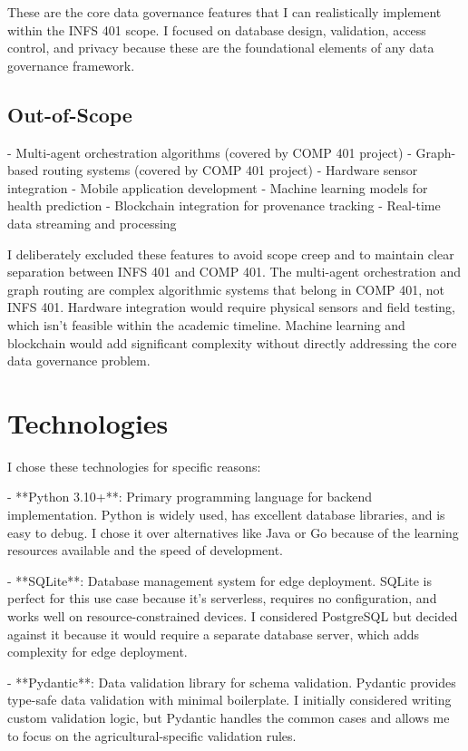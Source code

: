 These are the core data governance features that I can realistically implement within the INFS 401 scope. I focused on database design, validation, access control, and privacy because these are the foundational elements of any data governance framework.

\subsection{Out-of-Scope}
- Multi-agent orchestration algorithms (covered by COMP 401 project)
- Graph-based routing systems (covered by COMP 401 project)
- Hardware sensor integration
- Mobile application development
- Machine learning models for health prediction
- Blockchain integration for provenance tracking
- Real-time data streaming and processing

I deliberately excluded these features to avoid scope creep and to maintain clear separation between INFS 401 and COMP 401. The multi-agent orchestration and graph routing are complex algorithmic systems that belong in COMP 401, not INFS 401. Hardware integration would require physical sensors and field testing, which isn't feasible within the academic timeline. Machine learning and blockchain would add significant complexity without directly addressing the core data governance problem.

\section{Technologies}

I chose these technologies for specific reasons:

- **Python 3.10+**: Primary programming language for backend implementation. Python is widely used, has excellent database libraries, and is easy to debug. I chose it over alternatives like Java or Go because of the learning resources available and the speed of development.

- **SQLite**: Database management system for edge deployment. SQLite is perfect for this use case because it's serverless, requires no configuration, and works well on resource-constrained devices. I considered PostgreSQL but decided against it because it would require a separate database server, which adds complexity for edge deployment.

- **Pydantic**: Data validation library for schema validation. Pydantic provides type-safe data validation with minimal boilerplate. I initially considered writing custom validation logic, but Pydantic handles the common cases and allows me to focus on the agricultural-specific validation rules.

